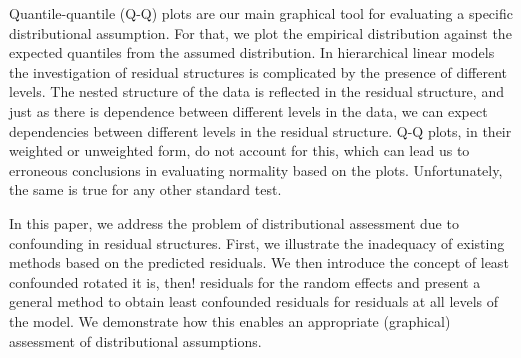\documentclass{article} %
\newcommand{\hh}[1]{{\color{orange} #1}}
\newcommand{\al}[1]{{\color{red} #1}}
\begin{document}
Quantile-quantile (Q-Q) plots \citep{Wilk:1968} are our main graphical tool for evaluating a specific distributional assumption. For that, we plot the empirical distribution against the expected quantiles from the assumed distribution. In hierarchical linear models the investigation of residual structures is complicated by the presence of  different levels. 
The nested structure of the data is reflected in the residual structure, and just as there is dependence between different levels in the data, we can expect dependencies between different levels in the residual structure. Q-Q plots, {in their} weighted \citep{Dempster:1985tr, Lange:1989uu} or unweighted {form}, do not account for this, which can lead us to erroneous conclusions in evaluating normality based on the plots. \hh{Unfortunately, the same is true for any other standard test. } %



In this paper, we address the problem of distributional assessment due to confounding in residual structures. 
First, we illustrate the inadequacy of existing methods  based on the predicted residuals. 
We then introduce  the concept of least confounded  \hh{rotated it is, then!} residuals for the random effects and present a general method to obtain least confounded residuals for residuals at all levels of the model. We demonstrate how this enables an appropriate (graphical) assessment  of distributional assumptions.
\end{document}
